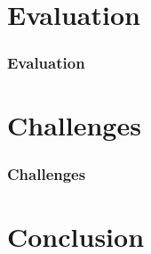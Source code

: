 \section{Evaluation}
\begin{frame}
  \frametitle{Evaluation}
\end{frame}

\section{Challenges}
\begin{frame}
  \frametitle{Challenges}
\end{frame}

\section{Conclusion}
